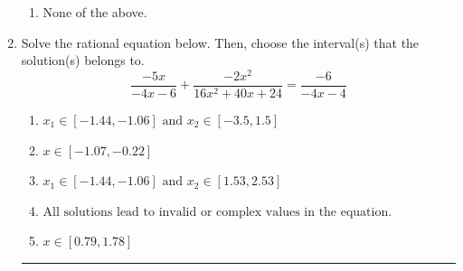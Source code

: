 \documentclass[14pt]{extbook}
\newcommand{\litem}[1]{\item#1\hspace*{-1cm}\rule{\textwidth}{0.4pt}}
\begin{document}
\begin{enumerate}
{\begin{enumerate}[label=\Alph*.]
\item None of the above.
\end{enumerate} }
\litem{
Solve the rational equation below. Then, choose the interval(s) that the solution(s) belongs to.\[ \frac{-5x}{-4x -6} + \frac{-2x^{2}}{16x^{2} +40 x + 24} = \frac{-6}{-4x -4} \]\begin{enumerate}[label=\Alph*.]
\item \( x_1 \in [-1.44, -1.06] \text{ and } x_2 \in [-3.5,1.5] \)
\item \( x \in [-1.07,-0.22] \)
\item \( x_1 \in [-1.44, -1.06] \text{ and } x_2 \in [1.53,2.53] \)
\item \( \text{All solutions lead to invalid or complex values in the equation.} \)
\item \( x \in [0.79,1.78] \)

\end{enumerate} }
\end{enumerate}
\end{document}
